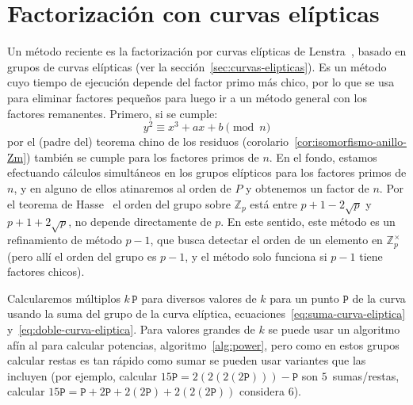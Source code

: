 \section{Factorización con curvas elípticas}
\label{sec:EC-factorizacion}

  Un método reciente es la factorización por curvas elípticas%
  de Lenstra~\cite{lenstra87:_factor_integ_ellip_curves},
  basado en grupos de curvas elípticas
  (ver la sección~\ref{sec:curvas-elipticas}).
  Es un método cuyo tiempo de ejecución depende del factor primo más chico,
  por lo que se usa para eliminar factores pequeños
  para luego ir a un método general con los factores remanentes.
  Primero,
  si se cumple:
  \begin{equation}
    \label{eq:curva-eliptica-factorizacion}
    y^2
      \equiv x^3 + a x + b \pmod{n}
  \end{equation}
  por el (padre del) teorema chino de los residuos
  (corolario~\ref{cor:isomorfismo-anillo-Zm})
  también se cumple para los factores primos de \(n\).
  En el fondo,
  estamos efectuando
  cálculos simultáneos
  en los grupos elípticos para los factores primos de \(n\),
  y en alguno de ellos atinaremos al orden de \(P\)
  y obtenemos un factor de \(n\).
  Por el teorema de Hasse~%
    \cite{hasse36:_EC-I,hasse36:_EC-II,hasse36:_EC-III}
  el orden del grupo sobre \(\mathbb{Z}_p\) está entre
  \(p + 1 - 2 \sqrt{p}\) y \(p + 1 + 2 \sqrt{p}\),
  no depende directamente de \(p\).
  En este sentido,
  este método es un refinamiento de método \(p - 1\),
  que busca detectar
  el orden de un elemento en \(\mathbb{Z}_p^\times\)
  (pero allí el orden del grupo es \(p - 1\),
   y el método solo funciona si \(p - 1\) tiene factores chicos).

  Calcularemos múltiplos \(k \, \mathtt{P}\)
  para diversos valores de \(k\)
  para un punto \(\mathtt{P}\) de la curva
  usando la suma del grupo de la curva elíptica,
  ecuaciones~\eqref{eq:suma-curva-eliptica}
  y~\eqref{eq:doble-curva-eliptica}.
  Para valores grandes de \(k\)
  se puede usar un algoritmo afín al para calcular potencias,
  algoritmo~\ref{alg:power},%
  pero como en estos grupos calcular restas es tan rápido como sumar
  se pueden usar variantes que las incluyen
  (por ejemplo,
   calcular \(15 \mathtt{P} = 2( 2 (2 (2 \mathtt{P}))) - \mathtt{P}\)
   son \(5\)~sumas/restas,
   calcular
     \(15 \mathtt{P}
	 = \mathtt{P} + 2 \mathtt{P}
	     + 2 (2 \mathtt{P}) + 2 (2 (2 \mathtt{P}))\)
   considera \(6\)).

